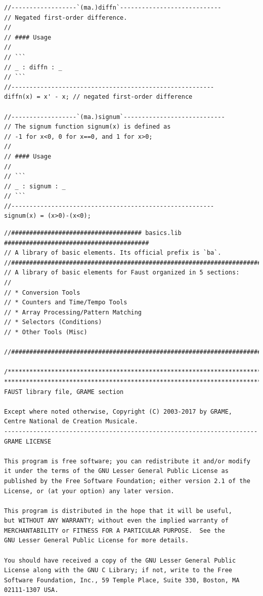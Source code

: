 \documentclass{article}
\begin{document}
\begin{lstlisting}[caption=\texttt{maths.lib}]
//------------------`(ma.)diffn`----------------------------
// Negated first-order difference.
//
// #### Usage
//
// ```
// _ : diffn : _
// ```
//--------------------------------------------------------
diffn(x) = x' - x; // negated first-order difference

//------------------`(ma.)signum`----------------------------
// The signum function signum(x) is defined as
// -1 for x<0, 0 for x==0, and 1 for x>0;
//
// #### Usage
//
// ```
// _ : signum : _
// ```
//--------------------------------------------------------
signum(x) = (x>0)-(x<0);
\end{lstlisting}


\bigskip\bigskip
\begin{lstlisting}[caption=\texttt{basics.lib}]
//#################################### basics.lib ########################################
// A library of basic elements. Its official prefix is `ba`.
//########################################################################################
// A library of basic elements for Faust organized in 5 sections:
//
// * Conversion Tools
// * Counters and Time/Tempo Tools
// * Array Processing/Pattern Matching
// * Selectors (Conditions)
// * Other Tools (Misc)

//########################################################################################

/************************************************************************
************************************************************************
FAUST library file, GRAME section

Except where noted otherwise, Copyright (C) 2003-2017 by GRAME,
Centre National de Creation Musicale.
----------------------------------------------------------------------
GRAME LICENSE

This program is free software; you can redistribute it and/or modify
it under the terms of the GNU Lesser General Public License as
published by the Free Software Foundation; either version 2.1 of the
License, or (at your option) any later version.

This program is distributed in the hope that it will be useful,
but WITHOUT ANY WARRANTY; without even the implied warranty of
MERCHANTABILITY or FITNESS FOR A PARTICULAR PURPOSE.  See the
GNU Lesser General Public License for more details.

You should have received a copy of the GNU Lesser General Public
License along with the GNU C Library; if not, write to the Free
Software Foundation, Inc., 59 Temple Place, Suite 330, Boston, MA
02111-1307 USA.


\end{lstlisting}
\end{document}
